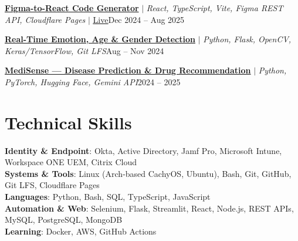 \documentclass[a4paper]{article}
\begin{document}
      \resumeProjectHeading
        {\href{https://github.com/ep0chzero/figma-metadata-viewer/tree/ai-code-gen}{\textbf{Figma-to-React Code Generator}} $|$ \emph{React, TypeScript, Vite, Figma REST API, Cloudflare Pages} $|$ \href{https://figma-metadata-viewer.pages.dev}{\underline{Live}}}{Dec 2024 -- Aug 2025}
      \resumeItemListStart
      \resumeItemListEnd

      \resumeProjectHeading
        {\href{https://github.com/ep0chzero/realtime-emogenage}{\textbf{Real-Time Emotion, Age \& Gender Detection}} $|$ \emph{Python, Flask, OpenCV, Keras/TensorFlow, Git LFS}}{Aug -- Nov 2024}
      \resumeItemListStart
      \resumeItemListEnd

      \resumeProjectHeading
        {\href{https://github.com/ep0chzero/Disease-Prediction-and-Drug-Recommendation-Prototype}{\textbf{MediSense --- Disease Prediction \& Drug Recommendation}} $|$ \emph{Python, PyTorch, Hugging Face, Gemini API}}{2024 -- 2025}
      \resumeItemListStart
      \resumeItemListEnd
    \resumeSubHeadingListEnd
\vspace{-4pt}

\section{Technical Skills}
\begin{resumeBlock}
\textbf{Identity \& Endpoint}{: Okta, Active Directory, Jamf Pro, Microsoft Intune, Workspace ONE UEM, Citrix Cloud} \\
\textbf{Systems \& Tools}{: Linux (Arch-based CachyOS, Ubuntu), Bash, Git, GitHub, Git LFS, Cloudflare Pages} \\
\textbf{Languages}{: Python, Bash, SQL, TypeScript, JavaScript} \\
\textbf{Automation \& Web}{: Selenium, Flask, Streamlit, React, Node.js, REST APIs, MySQL, PostgreSQL, MongoDB} \\
\textbf{Learning}{: Docker, AWS, GitHub Actions}
\end{resumeBlock}
\vspace{-6pt}
\end{document}
